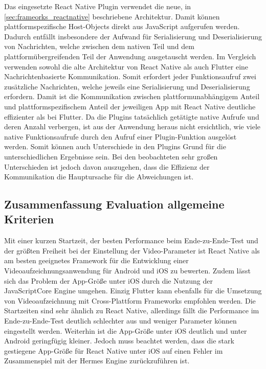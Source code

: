 Das eingesetzte React Native Plugin verwendet die neue, in \autoref{sec:frameorks_reactnative} beschriebene Architektur.
Damit können plattformspezifische Host-Objects direkt aus JavaScript aufgerufen werden.
Dadurch entfällt insbesondere der Aufwand für Serialisierung und Deserialisierung von Nachrichten, welche zwischen dem nativen Teil und dem plattformübergreifenden Teil der Anwendung ausgetauscht werden.
Im Vergleich verwenden sowohl die alte Architektur von React Native als auch Flutter eine Nachrichtenbasierte Kommunikation.
Somit erfordert jeder Funktionsaufruf zwei zusätzliche Nachrichten, welche jeweils eine Serialisierung und Deserialisierung erfordern.
Damit ist die Kommunikation zwischen plattformunabhängigem Anteil und plattformspezifischem Anteil der jeweiligen App mit React Native deutliche effizienter als bei Flutter.
Da die Plugins tatsächlich getätigte native Aufrufe und deren Anzahl verbergen, ist aus der Anwendung heraus nicht ersichtlich, wie viele native Funktionsaufrufe durch den Aufruf einer Plugin-Funktion ausgelöst werden.
Somit können auch Unterschiede in den Plugins Grund für die unterschiedlichen Ergebnisse sein.
Bei den beobachteten sehr großen Unterschieden ist jedoch davon auszugehen, dass die Effizienz der Kommunikation die Hauptursache für die Abweichungen ist.



\subsection{Zusammenfassung Evaluation allgemeine Kriterien}

Mit einer kurzen Startzeit, der besten Performance beim Ende-zu-Ende-Test und der größten Freiheit bei der Einstellung der Video-Parameter ist React Native als am besten geeignetes Framework für die Entwicklung einer Videoaufzeichnungsanwendung für Android und iOS zu bewerten.
Zudem lässt sich das Problem der App-Größe unter iOS durch die Nutzung der JavaScriptCore Engine umgehen.
Einzig Flutter kann ebenfalls für die Umsetzung von Videoaufzeichnung mit Cross-Plattform Frameworks empfohlen werden.
Die Startzeiten sind sehr ähnlich zu React Native, allerdings fällt die Performance im Ende-zu-Ende-Test deutlich schlechter aus und weniger Parameter können eingestellt werden.
Weiterhin ist die App-Größe unter iOS deutlich und unter Android geringfügig kleiner.
Jedoch muss beachtet werden, dass die stark gestiegene App-Größe für React Native unter iOS auf einen Fehler im Zusammenspiel mit der Hermes Engine zurückzuführen ist.


